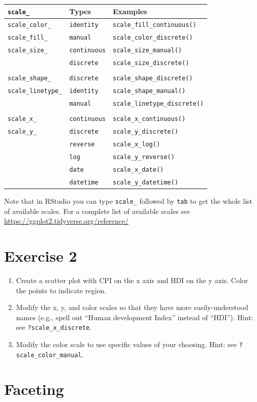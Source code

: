 \documentclass[]{book}
\providecommand{\tightlist}{%
  \setlength{\itemsep}{0pt}\setlength{\parskip}{0pt}}
\begin{document}
\begin{longtable}[]{@{}lll@{}}
\toprule
\texttt{scale\_} & Types & Examples\tabularnewline
\midrule
\endhead
\texttt{scale\_color\_} & \texttt{identity} &
\texttt{scale\_fill\_continuous()}\tabularnewline
\texttt{scale\_fill\_} & \texttt{manual} &
\texttt{scale\_color\_discrete()}\tabularnewline
\texttt{scale\_size\_} & \texttt{continuous} &
\texttt{scale\_size\_manual()}\tabularnewline
& \texttt{discrete} & \texttt{scale\_size\_discrete()}\tabularnewline
& &\tabularnewline
\texttt{scale\_shape\_} & \texttt{discrete} &
\texttt{scale\_shape\_discrete()}\tabularnewline
\texttt{scale\_linetype\_} & \texttt{identity} &
\texttt{scale\_shape\_manual()}\tabularnewline
& \texttt{manual} & \texttt{scale\_linetype\_discrete()}\tabularnewline
& &\tabularnewline
\texttt{scale\_x\_} & \texttt{continuous} &
\texttt{scale\_x\_continuous()}\tabularnewline
\texttt{scale\_y\_} & \texttt{discrete} &
\texttt{scale\_y\_discrete()}\tabularnewline
& \texttt{reverse} & \texttt{scale\_x\_log()}\tabularnewline
& \texttt{log} & \texttt{scale\_y\_reverse()}\tabularnewline
& \texttt{date} & \texttt{scale\_x\_date()}\tabularnewline
& \texttt{datetime} & \texttt{scale\_y\_datetime()}\tabularnewline
\bottomrule
\end{longtable}

Note that in RStudio you can type \texttt{scale\_} followed by
\texttt{tab} to get the whole list of available scales. For a complete
list of available scales see
\url{https://ggplot2.tidyverse.org/reference/}

\section{Exercise 2}\label{exercise-2-1}

\begin{enumerate}
\def\labelenumi{\arabic{enumi}.}
\tightlist
\item
  Create a scatter plot with CPI on the x axis and HDI on the y axis.
  Color the points to indicate region.
\item
  Modify the x, y, and color scales so that they have more
  easily-understood names (e.g., spell out ``Human development Index''
  instead of ``HDI''). Hint: see \texttt{?scale\_x\_discrete}.
\item
  Modify the color scale to use specific values of your choosing. Hint:
  see \texttt{?scale\_color\_manual}.
\end{enumerate}

\section{Faceting}\label{faceting}
\end{document}
